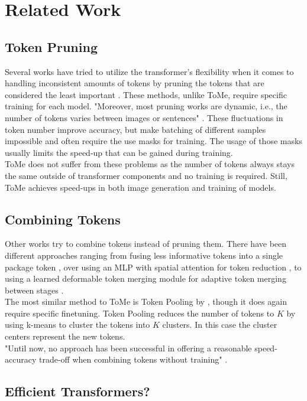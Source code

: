 \section{Related Work}


\subsection*{Token Pruning}
Several works have tried to utilize the transformer's flexibility when it comes to handling inconsistent amounts of tokens by pruning the tokens that are considered the least important \cite{meng2022adavit,yin2022vit}. These methods, unlike ToMe, require specific training for each model. "Moreover, most
pruning works are dynamic, i.e., the number of tokens varies between images or sentences" \cite{bolya2023tome}. These fluctuations in token number improve accuracy, but make batching of different samples impossible and often require the use masks for training. The usage of those masks usually limits the speed-up that can be gained during training.\\
ToMe does not suffer from these problems as the number of tokens always stays the same outside of transformer components and no training is required. Still, ToMe achieves speed-ups in both image generation and training of models.



\subsection*{Combining Tokens}
Other works try to combine tokens instead of pruning them.
There have been different approaches ranging from fusing less informative tokens into a single package token \cite{kong2021spvit, liang2022not}, over using an MLP with spatial attention for token reduction \cite{ryoo2021tokenlearner}, to using a learned deformable token merging module for adaptive token merging between stages \cite{pan2022less}.\\
The most similar method to ToMe is Token Pooling by \cite{marin2021token}, though it does again require specific finetuning. Token Pooling reduces the number of tokens to \(K\) by using k-means to cluster the tokens into \(K\) clusters. In this case the cluster centers represent the new tokens.\\
"Until now, no approach has been successful in offering a reasonable speed-accuracy trade-off when combining tokens without training" \cite{bolya2023tome}.



\subsection*{Efficient Transformers?}